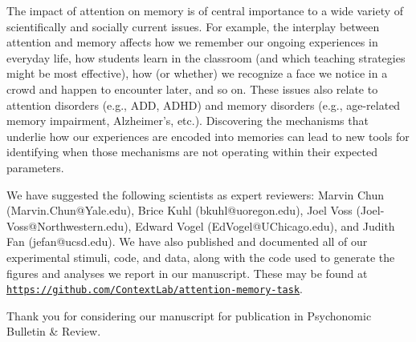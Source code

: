 \documentclass[10pt,stdletter,orderfromtodate,sigleft]{newlfm}
\begin{document}
\begin{newlfm}
The impact of attention on memory is of central importance to a wide
variety of scientifically and socially current issues.  For example,
the interplay between attention and memory affects how we remember our
ongoing experiences in everyday life, how students learn in the
classroom (and which teaching strategies might be most effective), how
(or whether) we recognize a face we notice in a crowd and
happen to encounter later, and so on.  These issues also relate to
attention disorders (e.g., ADD, ADHD) and memory disorders
(e.g., age-related memory impairment, Alzheimer's, etc.).  Discovering
the mechanisms that underlie how our experiences are encoded into
memories can lead to new tools for identifying when those mechanisms
are not operating within their expected parameters.

We have suggested the following scientists as expert reviewers: Marvin Chun
(Marvin.Chun@Yale.edu), Brice Kuhl (bkuhl@uoregon.edu), Joel Voss
(Joel-Voss@Northwestern.edu), Edward Vogel (Ed\-Vogel@UChi\-ca\-go.edu), and
Judith Fan (jefan@ucsd.edu). We have also published and documented all of our
experimental stimuli, code, and data, along with the code used to generate the
figures and analyses we report in our manuscript. These may be found at
\href{https://github.com/ContextLab/attention-memory-task}{\texttt{https://github.com/ContextLab/attention-memory-task}}.

Thank you for considering our manuscript for publication in
Psychonomic Bulletin \& Review.

\end{newlfm}
\end{document}
